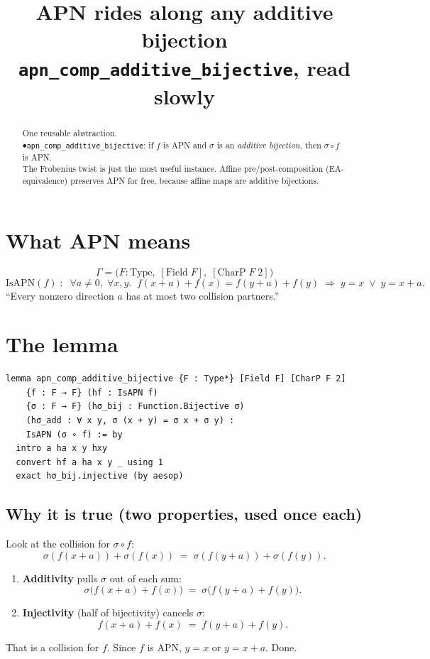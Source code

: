 \documentclass[11pt]{article}
\title{\textbf{APN rides along any additive bijection}\\[4pt]
\large \texttt{apn\_comp\_additive\_bijective}, read slowly}
\author{}
\date{}
\begin{document}
\maketitle

\begin{abstract}
\noindent
One reusable abstraction.\\[2pt]
$\bullet$\quad \texttt{apn\_comp\_additive\_bijective}:\;\;
if $f$ is APN and $\sigma$ is an \emph{additive bijection}, then $\sigma\circ f$ is APN.\\[6pt]
\noindent
The Frobenius twist is just the most useful instance. Affine pre/post-composition
(EA-equivalence) preserves APN for free, because affine maps are additive
bijections.
\end{abstract}

\bigskip

\section*{What APN means}

\[
\Gamma=\bigl(F:\mathrm{Type},\;[\mathrm{Field}\;F],\;[\mathrm{CharP}\;F\;2]\bigr)
\]
\[
\mathrm{IsAPN}(f)\;:\;\;
\forall a\neq 0,\;\forall x,y.\;\;
f(x{+}a){+}f(x)=f(y{+}a){+}f(y)\;\Rightarrow\; y=x \;\lor\; y=x{+}a .
\]
``Every nonzero direction $a$ has at most two collision partners.''

\bigskip

\section{The lemma}

\begin{lstlisting}
lemma apn_comp_additive_bijective {F : Type*} [Field F] [CharP F 2]
    {f : F → F} (hf : IsAPN f)
    {σ : F → F} (hσ_bij : Function.Bijective σ)
    (hσ_add : ∀ x y, σ (x + y) = σ x + σ y) :
    IsAPN (σ ∘ f) := by
  intro a ha x y hxy
  convert hf a ha x y _ using 1
  exact hσ_bij.injective (by aesop)
\end{lstlisting}

\bigskip
\subsection*{Why it is true (two properties, used once each)}

\noindent
Look at the collision for $\sigma\circ f$:
\[
\sigma(f(x{+}a))+\sigma(f(x)) \;=\; \sigma(f(y{+}a))+\sigma(f(y)).
\]
\begin{enumerate}\itemsep6pt
  \item \textbf{Additivity} pulls $\sigma$ out of each sum:
  \[
  \sigma\bigl(f(x{+}a)+f(x)\bigr) \;=\; \sigma\bigl(f(y{+}a)+f(y)\bigr).
  \]
  \item \textbf{Injectivity} (half of bijectivity) cancels $\sigma$:
  \[
  f(x{+}a)+f(x) \;=\; f(y{+}a)+f(y).
  \]
\end{enumerate}
That is a collision for $f$. Since $f$ is APN, $y=x$ or $y=x+a$. Done.
\end{document}
